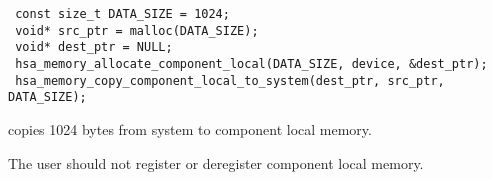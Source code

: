 \begin{framed}
\begin{lstlisting}
 const size_t DATA_SIZE = 1024;
 void* src_ptr = malloc(DATA_SIZE);
 void* dest_ptr = NULL;
 hsa_memory_allocate_component_local(DATA_SIZE, device, &dest_ptr);
 hsa_memory_copy_component_local_to_system(dest_ptr, src_ptr, DATA_SIZE);
\end{lstlisting}
\end{framed}

copies 1024 bytes from system to component local memory.

The user should not register or deregister component local memory.

